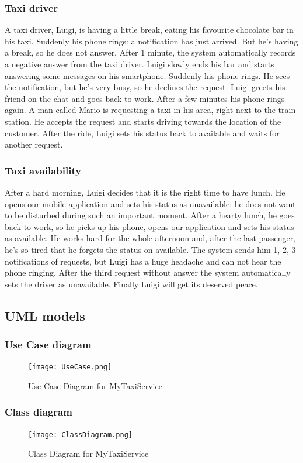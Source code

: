 \subsubsection{Taxi driver}
A taxi driver, Luigi, is having a little break, eating his favourite chocolate bar in his taxi. Suddenly
his phone rings: a notification has just arrived. But he's having a break, so he does not answer.
After 1 minute, the system automatically records a negative answer from the taxi driver.
Luigi slowly ends his bar and starts answering some messages on his smartphone. Suddenly his phone
rings. He sees the notification, but he's very busy, so he declines the request. Luigi greets his
friend on the chat and goes back to work. After a few minutes his phone rings again. A man called
Mario is requesting a taxi in his area, right next to the train station. He accepts the request and
starts driving towards the location of the customer. After the ride, Luigi sets his status back to
available and waits for another request.
\subsubsection{Taxi availability}
After a hard morning, Luigi decides that it is the right time to have lunch. He opens our mobile
application and sets his status as unavailable: he does not want to be disturbed during such an
important moment. After a hearty lunch, he goes back to work, so he picks up his phone, opens our
application and sets his status as available. He works hard for the whole afternoon and, after the
last passenger, he's so tired that he forgets the status on available. The system sends him 1, 2, 3
notifications of requests, but Luigi has a huge headache and can not hear the phone ringing. After
the third request without answer the system automatically sets the driver as unavailable.
Finally Luigi will get its deserved peace.
\newpage
\subsection{UML models}
\subsubsection{Use Case diagram}
\begin{figure}[h!]
	\centering
	\graphicspath{ {../SE2_IMAGES/} }
	\texttt{[image: UseCase.png]}
	\caption{Use Case Diagram for MyTaxiService}
\end{figure}
\newpage
\subsubsection{Class diagram}
\begin{figure}[h!]
	\centering
	\graphicspath{ {../SE2_IMAGES/} }
	\texttt{[image: ClassDiagram.png]}
	\caption{Class Diagram for MyTaxiService}
\end{figure}
\newpage
